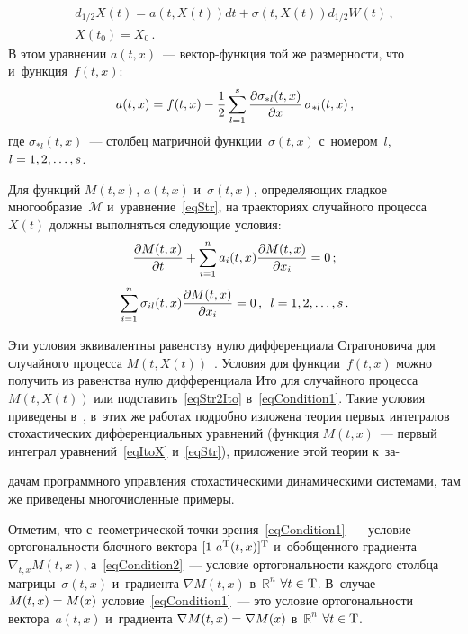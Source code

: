 \begin{multicols}{2}
\noindent
\begin{multline}
\label{eqStr}
  d_{1/2} X(t) = a \left( t,X(t) \right) dt + \sigma \left( t,X(t) \right) 
  d_{1/2} W(t)\,,\\ 
   X\left(t_0\right) = X_0\,.
\end{multline}
В этом уравнении $a(t,x)$~--- век\-тор-функ\-ция 
той же размерности, что и~функция~$f(t,x)$:
\begin{equation}
\label{eqStr2Ito}
  a(t,x) = f(t,x) - \displaystyle\frac{\displaystyle 1\mathstrut}{\displaystyle 2\mathstrut} \sum\limits_{l = 1}^s 
  {\displaystyle\frac{\displaystyle \partial \sigma_{* l}(t,x)\mathstrut}{\displaystyle \partial x\mathstrut} \, \sigma_{* l}(t,x)}\,,
\end{equation}
где $\sigma_{* l}(t,x)$~--- столбец матричной функции~$\sigma(t,x)$ с~номером~$l$, 
$l \hm= 1,2,\dots,s$.

Для функций $M(t,x)$, $a(t,x)$ и~$\sigma(t,x)$, определяющих гладкое 
многообразие~$\mathcal{M}$ и~уравнение~\eqref{eqStr}, на траекториях 
случайного процесса~$X(t)$ должны выполняться следующие условия:
\begin{equation}
\label{eqCondition1}
  \displaystyle\frac{\displaystyle \partial M(t,x)\mathstrut}{\displaystyle \partial t\mathstrut} + \sum\limits_{i=1}^n a_i(t,x)  
  \displaystyle\frac{\displaystyle \partial M(t,x)\mathstrut}{\displaystyle \partial x_i\mathstrut} = 0\,;
\end{equation}
\begin{equation}
\label{eqCondition2}
  \sum\limits_{i=1}^n \sigma_{il}(t,x) 
   \displaystyle\frac{\displaystyle \partial M(t,x)\mathstrut}{\displaystyle \partial x_i\mathstrut} = 0\,, \enskip l = 1,2,\dots,s\,.
\end{equation}

Эти условия эквивалентны равенству нулю дифференциала 
Стратоновича для случайного процесса $M(t,X(t))$~\cite{Dub_12}. Условия для 
функции~$f(t,x)$ можно получить из равенства нулю дифференциала Ито 
для случайного процесса~$M(t,X(t))$ или подставить~\eqref{eqStr2Ito} 
в~\eqref{eqCondition1}. Такие условия приведены 
в~\cite{Dub_89, Dub_12, Kar_14, Kar_15}, в~этих же работах подробно изложена 
тео\-рия первых интегралов стохастических дифференциальных уравнений 
(функция $M(t,x)$~--- первый интеграл
уравнений~\eqref{eqItoX} и~\eqref{eqStr}), 
приложение этой тео\-рии к~за-\linebreak\vspace*{-12pt}

\columnbreak

\noindent
 дачам программного управления стохастическими 
динамическими сис\-те\-ма\-ми, там же приведены многочисленные примеры.

Отметим, что с~геометрической точки зрения~\eqref{eqCondition1}~--- 
условие ортогональности блочного вектора $[  1 \  a^{{\mathrm{T}}}(t,x)]^{{\mathrm{T}}}$ 
и~обобщенного градиента $\nabla_{t,x} M(t,x)$, а~\eqref{eqCondition2}~--- 
условие ортогональности каж\-до\-го столбца матрицы~$\sigma(t,x)$ 
и~градиента $\nabla M(t,x)$ в~$\mathds{R}^n$ $\forall t \hm\in \mathrm{T}$. 
В~случае $M(t,x) \hm= M(x)$ условие~\eqref{eqCondition1}~--- 
это условие ортогональности вектора~$a(t,x)$ и~градиента $\nabla M(t,x) 
\hm= \nabla M(x)$ в~$\mathds{R}^n$ $\forall t \hm\in \mathrm{T}$.


\end{multicols}
